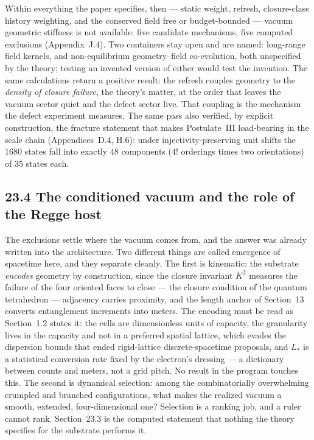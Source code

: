 \documentclass[11pt]{article}
\begin{document}
Within everything the paper specifies, then --- static weight, refresh, closure-class history weighting, and the conserved field free or budget-bounded --- vacuum geometric stiffness is not available: five candidate mechanisms, five computed exclusions (Appendix~J.4). Two containers stay open and are named: long-range field kernels, and non-equilibrium geometry--field co-evolution, both unspecified by the theory; testing an invented version of either would test the invention. The same calculations return a positive result: the refresh couples geometry to the \emph{density of closure failure}, the theory's matter, at the order that leaves the vacuum sector quiet and the defect sector live. That coupling is the mechanism the defect experiment measures. The same pass also verified, by explicit construction, the fracture statement that makes Postulate~III load-bearing in the scale chain (Appendices~D.4, H.6): under injectivity-preserving unit shifts the $1680$ states fall into exactly $48$ components ($4!$ orderings times two orientations) of $35$ states each.

\subsection{23.4 The conditioned vacuum and the role of the Regge host}

The exclusions settle where the vacuum comes from, and the answer was already written into the architecture. Two different things are called emergence of spacetime here, and they separate cleanly. The first is kinematic: the substrate \emph{encodes} geometry by construction, since the closure invariant $K^2$ measures the failure of the four oriented faces to close --- the closure condition of the quantum tetrahedron --- adjacency carries proximity, and the length anchor of Section~13 converts entanglement increments into meters. The encoding must be read as Section~1.2 states it: the cells are dimensionless units of capacity, the granularity lives in the capacity and not in a preferred spatial lattice, which evades the dispersion bounds that ended rigid-lattice discrete-spacetime proposals, and $L_*$ is a statistical conversion rate fixed by the electron's dressing --- a dictionary between counts and meters, not a grid pitch. No result in the program touches this. The second is dynamical selection: among the combinatorially overwhelming crumpled and branched configurations, what makes the realized vacuum a smooth, extended, four-dimensional one? Selection is a ranking job, and a ruler cannot rank. Section~23.3 is the computed statement that nothing the theory specifies for the substrate performs it.
\end{document}
